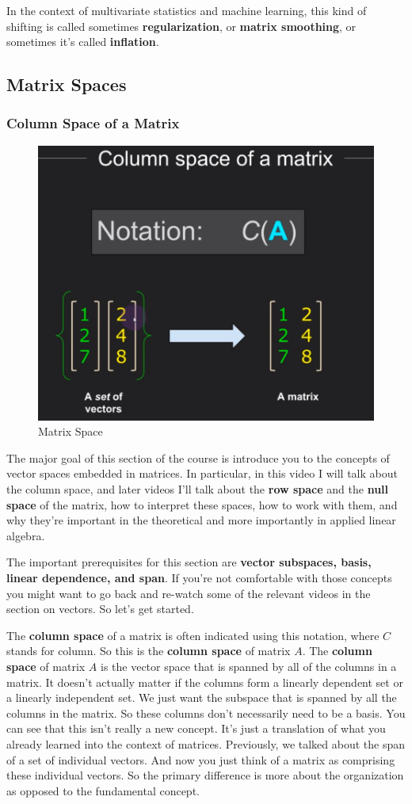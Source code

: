 \documentclass[fleqn,10pt]{olplainarticle}
\theoremstyle{definition}
\theoremstyle{remark}
\begin{document}
In the context of multivariate statistics and machine learning, this kind of shifting is called sometimes \textbf{regularization}, or \textbf{matrix smoothing}, or sometimes it's called \textbf{inflation}.

\pagebreak

\subsection*{Matrix Spaces}

\subsubsection*{Column Space of a Matrix}

\begin{figure}[ht]
	\centering
	\includegraphics[width=0.5\linewidth]{images/matrix-space-01.png}
	\caption{Matrix Space}
	\label{fig:matrix_space_01}
\end{figure}

The major goal of this section of the course is introduce you to the concepts of vector spaces embedded in matrices. In particular, in this video I will talk about the column space, and later videos I'll talk about the \textbf{row space} and the \textbf{null space} of the matrix, how to interpret these spaces, how to work with them, and why they're important in the theoretical and more importantly in applied linear algebra.

The important prerequisites for this section are \textbf{vector subspaces, basis, linear dependence, and span}. If you're not comfortable with those concepts you might want to go back and re-watch some of the relevant videos in the section on vectors. So let's get started.

The \textbf{column space} of a matrix is often indicated using this notation, where $C$ stands for column. So this is the \textbf{column space} of matrix $A$. The \textbf{column space} of matrix $A$ is the vector space that is spanned by all of the columns in a matrix. It doesn't actually matter if the columns form a linearly dependent set or a linearly independent set. We just want the subspace that is spanned by all the columns in the matrix. So these columns don't necessarily need to be a basis. You can see that this isn't really a new concept. It's just a translation of what you already learned into the context of matrices. Previously, we talked about the span of a set of individual vectors. And now you just think of a matrix as comprising these individual vectors. So the primary difference is more about the organization as opposed to the fundamental concept.
\end{document}
